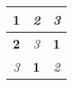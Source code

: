 \documentclass[border=2px]{standalone}
\begin{document}
\pagecolor{pink}
\begin{tabular}{|c|c|c|}
        \hline
        \textbf{1} & \textit{2} & \textit{3} \\
        \hline
        \textbf{2} & \textit{3} & \textbf{1} \\
        \hline
        \textit{3} & \textbf{1} & \textit{2} \\
        \hline
    \end{tabular}
\end{document}
